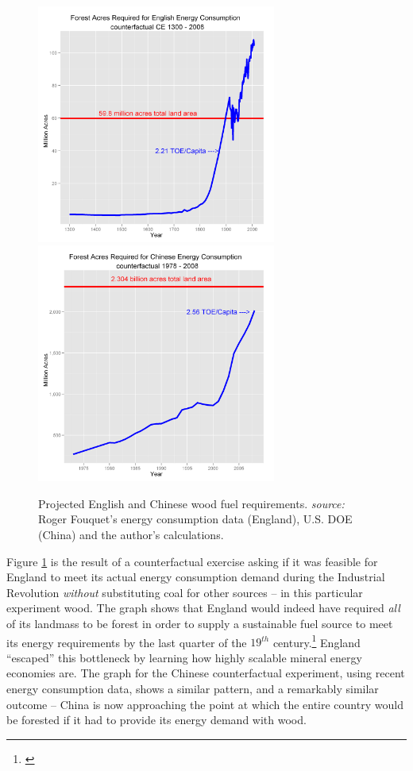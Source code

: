\documentclass[12pt]{article}
\numberwithin{equation}{section}
\begin{document}
			
		\begin{figure}[ftb]
		\centerline{
		\mbox{\includegraphics[width=0.70\textwidth]{wood.png}}
		\mbox{\includegraphics[width=0.70\textwidth]{chinawood.png}}
		}
		\caption{Projected English and Chinese wood fuel requirements. \textit{source:} Roger Fouquet's energy consumption data (England), U.S. DOE (China) and the author's calculations.} 
		\label{fig:eng_wood}
		\end{figure}
		
	
		Figure \ref{fig:eng_wood} is the result of a counterfactual exercise asking if it was feasible for England to meet its actual energy consumption demand during the Industrial Revolution \textit{without} substituting coal for other sources -- in this particular experiment wood.  The graph shows that England would indeed have required \textit{all} of its landmass to be forest in order to supply a sustainable fuel source to meet its energy requirements by the last quarter of the $19^{th}$ century.\footnote{\citet{fouquet_heat_2008}} England ``escaped'' this bottleneck by learning how highly scalable mineral energy economies are. The graph for the Chinese counterfactual experiment, using recent energy consumption data, shows a similar pattern, and a remarkably similar outcome -- China is now approaching the point at which the entire country would be forested if it had to provide its energy demand with wood.
		
\end{document}
